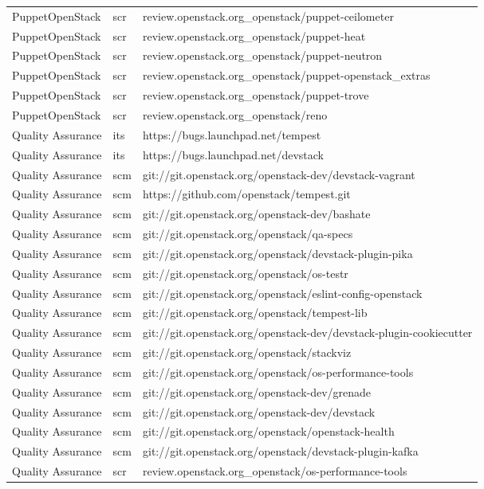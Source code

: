 \begin{center}
\begin{longtable}{|p{4cm}|p{1cm}|p{10cm}|}
PuppetOpenStack&scr&review.openstack.org\_openstack/puppet-ceilometer\\ 
PuppetOpenStack&scr&review.openstack.org\_openstack/puppet-heat\\ 
PuppetOpenStack&scr&review.openstack.org\_openstack/puppet-neutron\\ 
PuppetOpenStack&scr&review.openstack.org\_openstack/puppet-openstack\_extras\\ 
PuppetOpenStack&scr&review.openstack.org\_openstack/puppet-trove\\ 
PuppetOpenStack&scr&review.openstack.org\_openstack/reno\\ 
Quality Assurance&its&https://bugs.launchpad.net/tempest\\ 
Quality Assurance&its&https://bugs.launchpad.net/devstack\\ 
Quality Assurance&scm&git://git.openstack.org/openstack-dev/devstack-vagrant\\ 
Quality Assurance&scm&https://github.com/openstack/tempest.git\\ 
Quality Assurance&scm&git://git.openstack.org/openstack-dev/bashate\\ 
Quality Assurance&scm&git://git.openstack.org/openstack/qa-specs\\ 
Quality Assurance&scm&git://git.openstack.org/openstack/devstack-plugin-pika\\ 
Quality Assurance&scm&git://git.openstack.org/openstack/os-testr\\ 
Quality Assurance&scm&git://git.openstack.org/openstack/eslint-config-openstack\\ 
Quality Assurance&scm&git://git.openstack.org/openstack/tempest-lib\\ 
Quality Assurance&scm&git://git.openstack.org/openstack-dev/devstack-plugin-cookiecutter\\ 
Quality Assurance&scm&git://git.openstack.org/openstack/stackviz\\ 
Quality Assurance&scm&git://git.openstack.org/openstack/os-performance-tools\\ 
Quality Assurance&scm&git://git.openstack.org/openstack-dev/grenade\\ 
Quality Assurance&scm&git://git.openstack.org/openstack-dev/devstack\\ 
Quality Assurance&scm&git://git.openstack.org/openstack/openstack-health\\ 
Quality Assurance&scm&git://git.openstack.org/openstack/devstack-plugin-kafka\\ 
Quality Assurance&scr&review.openstack.org\_openstack/os-performance-tools\\ 

\end{longtable}
\end{center}

